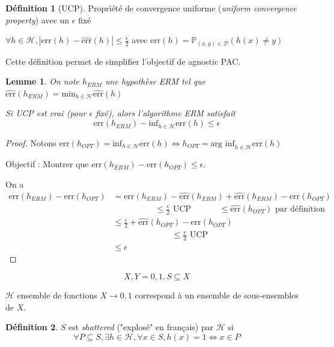 \documentclass{article}
\newtheorem{lemma}[theorem]{Lemme}
\theoremstyle{definition}
\newtheorem{definition}{Définition}[section]
\theoremstyle{remark}
\begin{document}
\begin{definition}[UCP]
    Propriété de convergence uniforme (\textit{uniform convergence property}) avec un $\epsilon$ fixé
    
    $\forall h\in\mathcal{H}, |\mbox{err}(h)-\widehat{\mbox{err}}(h)|\leq\frac{\epsilon}{2}$
    avec $\mbox{err}(h) = \mathbb{P}_{(x,y)\in\mathcal{D}}(h(x)\neq y)$
\end{definition}
Cette définition permet de simplifier l'objectif de agnostic PAC. 

\begin{lemma}
    On note $h_{ERM}$ une hypothèse ERM tel que $\widehat{\mbox{err}}(h_{ERM})=\mbox{min}_{h\in\mathcal{H}}\widehat{\mbox{err}}(h)$

    Si UCP est vrai (pour $\epsilon$ fixé), alors l'algorithme ERM satisfait $$\mbox{err}(h_{ERM}) - \mbox{inf}_{h\in\mathcal{H}}\mbox{err}(h)\leq\epsilon$$
\end{lemma}

\begin{proof}
    Notons $\mbox{err}(h_{OPT})=\mbox{inf}_{h\in\mathcal{H}}\mbox{err}(h) \Leftrightarrow h_{OPT}=\mbox{arg inf}_{h\in\mathcal{H}}\mbox{err}(h)$
    
    Objectif : Montrer que $\mbox{err}(h_{ERM})-\mbox{err}(h_{OPT})\leq\epsilon$.
    
    On a 
    \begin{align*}
        \mbox{err}(h_{ERM})-\mbox{err}(h_{OPT}) &= \mbox{err}(h_{ERM})-\widehat{\mbox{err}}(h_{ERM})+\widehat{\mbox{err}}(h_{ERM})-\mbox{err}(h_{OPT})\\
        &\hspace{5em} \leq\frac{\epsilon}{2}\mbox{ UCP }
        \hspace{3em} \leq\widehat{\mbox{err}}(h_{OPT})\mbox{ par définition}\\
        &\leq \frac{\epsilon}{2}+\widehat{\mbox{err}}(h_{OPT})-\mbox{err}(h_{OPT})\\
        &\hspace{7em} \leq\frac{\epsilon}{2}\mbox{ UCP}\\
        &\leq \epsilon
    \end{align*}
\end{proof}

$$X, Y={0,1}, S\subseteq X$$

$\mathcal{H}$ ensemble de fonctions $X\to {0,1}$ correspond à un ensemble de sous-ensembles de $X$.

\begin{definition}
    $S$ est \textit{shattered} ("explosé" en français) par $\mathcal{H}$ si
    \begin{equation*}
        \forall P\subseteq S, \exists h\in\mathcal{H}, \forall x\in S, h(x) = 1 \Leftrightarrow x\in P
    \end{equation*}
\end{definition}
\end{document}
